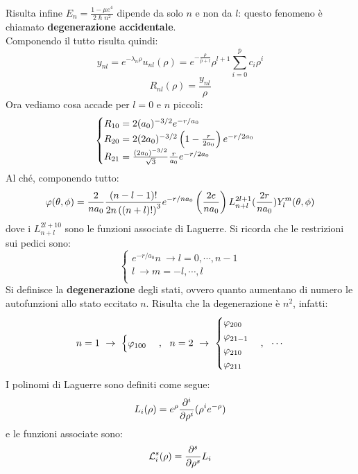 Risulta infine $E_n = \frac{1-\mu e^4}{2\hslash n^2}$ dipende da solo $n$ e non da $l$: questo fenomeno è chiamato \textbf{degenerazione accidentale}.\\
Componendo il tutto risulta quindi: 
\[
    y_{nl} = e^{-\lambda_n \rho} u_{nl}(\rho) = e^{-\frac{\rho}{\bar p+l}} \rho^{l+1} \sum_{i=0}^{\bar p} c_i \rho^i \]\[
    R_{nl}(\rho) = \frac{y_{nl}}{\rho}
\]
Ora vediamo cosa accade per $l = 0$ e $n$ piccoli:
\[
    \begin{cases}
        R_{10} = 2(a_0)^{-3/2}e^{-r/a_0} \\
        R_{20} = 2(2a_0)^{-3/2} \l 1 - \frac{r}{2a_0} \r e^{-r/2a_0} \\
        R_{21} = \frac{(2a_0)^{-3/2}}{\sqrt 3} \frac{r}{a_0} e^{-r/2a_0}
    \end{cases}
\]
Al ché, componendo tutto:
\[
    \vphi(\theta, \phi) = \frac{2}{na_0} \frac{(n-l-1)!}{2n\l (n+l)! \r^3}e^{-r/na_0} \l \frac{2e}{na_0} \r L_{n+l}^{2l+1}(\frac{2r}{na_0}) Y_l^m(\theta, \phi)
\]
dove i $L_{n+l}^{2l+10}$ sono le funzioni associate di Laguerre. Si ricorda che le restrizioni sui pedici sono:
\[
\begin{cases}e^{-r/a_0}
    n\ \rightarrow l = 0, \cdots, n-1 \\
    l\ \rightarrow m = -l, \cdots, l \\
\end{cases}
\]
Si definisce la \textbf{degenerazione} degli stati, ovvero quanto aumentano di numero le autofunzioni allo stato eccitato $n$. Risulta che la degenerazione è $n^2$, infatti:
\[
   n = 1\  \rightarrow \ \begin{cases}
        \vphi_{100}
    \end{cases}, \ \ 
   n = 2\  \rightarrow \ \begin{cases}
        \vphi_{200} \\
        \vphi_{21-1} \\
        \vphi_{210} \\
        \vphi_{211}
    \end{cases}, \ \ \cdots
\]
I polinomi di Laguerre sono definiti come segue:
\[
    L_i (\rho) = e^{\rho} \nderiv[\rho]{}{i}(\rho^i e^{-\rho})
\]
e le funzioni associate sono:
\[
    \L_i^s(\rho) = \nderiv[\rho]{}{s}L_i
\]

